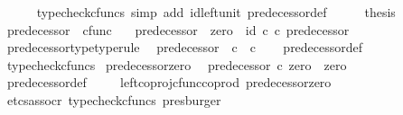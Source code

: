 \begin{isabellebody}
\ \ \ \ \isamarkupfalse%
\ {\isacharparenleft}{\kern0pt}typecheck{\isacharunderscore}{\kern0pt}cfuncs{\isacharcomma}{\kern0pt}\ simp\ add{\isacharcolon}{\kern0pt}\ id{\isacharunderscore}{\kern0pt}left{\isacharunderscore}{\kern0pt}unit{}\ predecessor{\isacharprime}{\kern0pt}{\isacharunderscore}{\kern0pt}def{}{\isacharparenright}{\kern0pt}\isanewline
\ \ \isamarkupfalse%
\ \isamarkupfalse%
\ {\isacharquery}{\kern0pt}thesis\isacommand{{\isachardot}{\kern0pt}}\isamarkupfalse%
\isanewline
{}\isamarkupfalse%
%
\endisatagproof
{\isafoldproof}%
%
\isadelimproof
\isanewline
%
\endisadelimproof
\isanewline
{}\isamarkupfalse%
\ predecessor\ {\isacharcolon}{\kern0pt}{\isacharcolon}{\kern0pt}\ {\isachardoublequoteopen}cfunc{\isachardoublequoteclose}\isanewline
\ \ \ {\isachardoublequoteopen}predecessor\ {\isacharequal}{\kern0pt}\ {\isacharparenleft}{\kern0pt}zero\ {\isasymamalg}\ id\ {\isasymnat}\isactrlsub c{\isacharparenright}{\kern0pt}\ {\isasymcirc}\isactrlsub c\ predecessor{\isacharprime}{\kern0pt}{\isachardoublequoteclose}\isanewline
\isanewline
{}\isamarkupfalse%
\ predecessor{\isacharunderscore}{\kern0pt}type{\isacharbrackleft}{\kern0pt}type{\isacharunderscore}{\kern0pt}rule{\isacharbrackright}{\kern0pt}{\isacharcolon}{\kern0pt}\isanewline
\ \ {\isachardoublequoteopen}predecessor\ {\isacharcolon}{\kern0pt}\ {\isasymnat}\isactrlsub c\ {\isasymrightarrow}\ {\isasymnat}\isactrlsub c{\isachardoublequoteclose}\isanewline
%
\isadelimproof
\ \ %
\endisadelimproof
%
\isatagproof
{}\isamarkupfalse%
\ predecessor{\isacharunderscore}{\kern0pt}def\ \isamarkupfalse%
\ typecheck{\isacharunderscore}{\kern0pt}cfuncs%
\endisatagproof
{\isafoldproof}%
%
\isadelimproof
\isanewline
%
\endisadelimproof
\isanewline
{}\isamarkupfalse%
\ predecessor{\isacharunderscore}{\kern0pt}zero{\isacharcolon}{\kern0pt}\isanewline
\ \ {\isachardoublequoteopen}predecessor\ {\isasymcirc}\isactrlsub c\ zero\ {\isacharequal}{\kern0pt}\ zero{\isachardoublequoteclose}\isanewline
%
\isadelimproof
\ \ %
\endisadelimproof
%
\isatagproof
{}\isamarkupfalse%
\ predecessor{\isacharunderscore}{\kern0pt}def\ \isanewline
\ \ \isamarkupfalse%
\ left{\isacharunderscore}{\kern0pt}coproj{\isacharunderscore}{\kern0pt}cfunc{\isacharunderscore}{\kern0pt}coprod\ predecessor{\isacharprime}{\kern0pt}{\isacharunderscore}{\kern0pt}zero\ \isamarkupfalse%
\ {\isacharparenleft}{\kern0pt}etcs{\isacharunderscore}{\kern0pt}assocr{\isacharcomma}{\kern0pt}\ typecheck{\isacharunderscore}{\kern0pt}cfuncs{\isacharcomma}{\kern0pt}\ presburger{\isacharparenright}{\kern0pt}%

\end{isabellebody}
